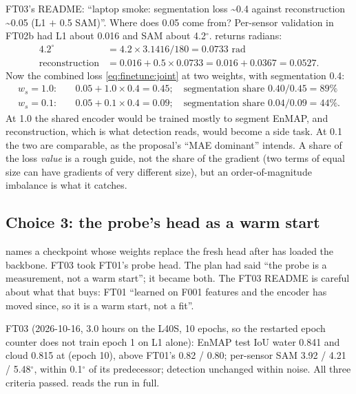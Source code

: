 FT03's README: ``laptop smoke: segmentation loss \textasciitilde 0.4 against reconstruction \textasciitilde 0.05 (L1 $+$ 0.5 SAM)''.\tbrk{}
Where does 0.05 come from? Per-sensor validation in FT02b had L1 about 0.016 and SAM about 4.2$^\circ$.  returns radians:
\begin{align*}
  4.2^\circ &= 4.2 \times 3.1416 / 180 = 0.0733 \text{ rad}\\
  \text{reconstruction} &= 0.016 + 0.5 \times 0.0733 = 0.016 + 0.0367 = 0.0527.
\end{align*}
Now the combined loss \eqref{eq:finetune:joint} at two weights, with segmentation 0.4:
\begin{align*}
  w_s = 1.0:&\quad 0.05 + 1.0 \times 0.4 = 0.45; \quad\text{segmentation share } 0.40 / 0.45 = 89\%\\
  w_s = 0.1:&\quad 0.05 + 0.1 \times 0.4 = 0.09; \quad\text{segmentation share } 0.04 / 0.09 = 44\%.
\end{align*}
At 1.0 the shared encoder would be trained mostly to segment EnMAP, and reconstruction, which is what detection reads, would become a side task. At 0.1 the two
are comparable, as the proposal's ``MAE dominant'' intends. A share of the loss \emph{value} is a rough guide, not the share of the gradient (two terms of
equal size can have gradients of very different size), but an order-of-magnitude imbalance is what it catches.

\subsection{Choice 3: the probe's head as a warm start}

 names a checkpoint whose  weights replace the fresh head after  has loaded the backbone. FT03 took FT01's
probe head. The plan had said ``the probe is a measurement, not a warm start''; it became both. The FT03 README is careful about what that buys: FT01 ``learned
on F001 features and the encoder has moved since, so it is a warm start, not a fit''.

\begin{drift}
FT03 (2026-10-16, 3.0 hours on the L40S, 10 epochs,  so the restarted epoch counter does not train epoch 1 on L1 alone): EnMAP test IoU
water 0.841 and cloud 0.815 at  (epoch 10), above FT01's 0.82 / 0.80; per-sensor SAM 3.92 / 4.21 / 5.48$^\circ$, within 0.1$^\circ$ of its
predecessor; detection unchanged within noise. All three criteria passed.\tbrk{}
 reads the run in full.
\end{drift}

